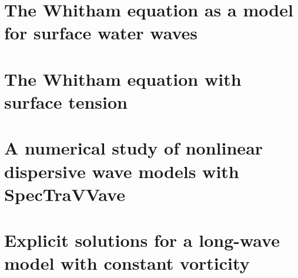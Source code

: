 \section{The Whitham equation as a model for surface water waves}







\section{The Whitham equation with surface tension}






\section{A numerical study of nonlinear dispersive wave models with SpecTraVVave}





\section{Explicit solutions for a long-wave model with constant vorticity}
